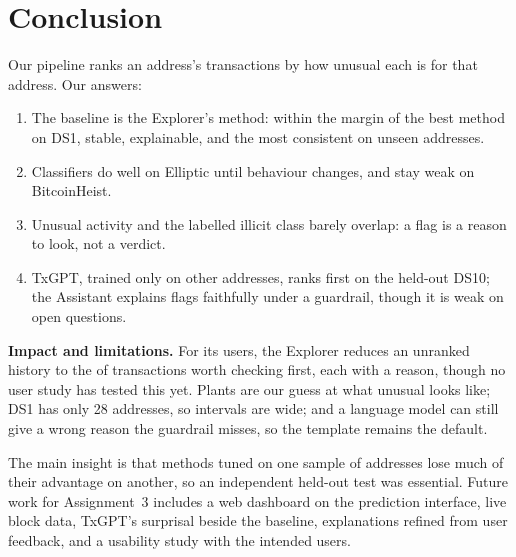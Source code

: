 \section{Conclusion}
\label{sec:conclusion}

Our pipeline ranks an address's transactions by how unusual each is for that address. Our answers:
\begin{enumerate}[label=RQ\arabic*]
  \item The baseline is the Explorer's method: within the margin of the best method on DS1, stable, explainable,
    and the most consistent on unseen addresses.
  \item Classifiers do well on Elliptic until behaviour changes, and stay weak on BitcoinHeist.
  \item Unusual activity and the labelled illicit class barely overlap: a flag is a reason to look, not a verdict.
  \item TxGPT, trained only on other addresses, ranks first on the held-out DS10; the Assistant explains
    flags faithfully under a guardrail, though it is weak on open questions.
\end{enumerate}

\textbf{Impact and limitations.} For its users, the Explorer reduces an unranked history to the
 of transactions worth checking first, each with a reason, though no user study has tested
this yet. Plants are our guess at what unusual looks like; DS1 has only 28 addresses, so intervals are wide; and a language model can still give a wrong reason the guardrail misses, so the
template remains the default.

The main insight is that methods tuned on one sample of addresses lose much of their advantage on another, so an
independent held-out test was essential. Future work for Assignment~3 includes a web dashboard on the
prediction interface, live block data, TxGPT's surprisal beside the baseline, explanations refined from user
feedback, and a usability study with the intended users.
